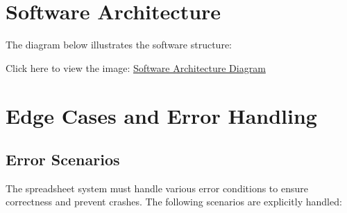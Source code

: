 \documentclass[a4paper,12pt]{article}
\begin{document}
\section{Software Architecture}
The diagram below illustrates the software structure:

Click here to view the image:  
\href{https://drive.google.com/file/d/1Amrq-pQD6De4khqhliiIPT55cB9PHjNN/view?usp=sharing}{Software Architecture Diagram}



\section{Edge Cases and Error Handling}
\subsection{Error Scenarios}
The spreadsheet system must handle various error conditions to ensure correctness and prevent crashes. The following scenarios are explicitly handled:
\end{document}
